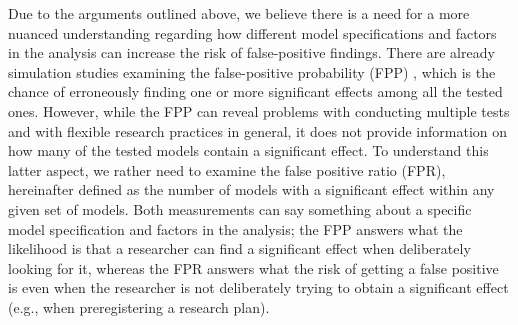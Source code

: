 Due to the arguments outlined above, we believe there is a need for a more nuanced understanding regarding how different model specifications and factors in the analysis can increase the risk of false-positive findings. There are already simulation studies examining the false-positive probability (FPP) \citep{Simmons2011}, which is the chance of erroneously finding one or more significant effects among all the tested ones. However, while the FPP can reveal problems with conducting multiple tests and with flexible research practices in general, it does not provide information on how many of the tested models contain a significant effect. To understand this latter aspect, we rather need to examine the false positive ratio (FPR), hereinafter defined as the number of models with a significant effect within any given set of models. Both measurements can say something about a specific model specification and factors in the analysis; the FPP answers what the likelihood is that a researcher can find a significant effect when deliberately looking for it, whereas the FPR answers what the risk of getting a false positive is even when the researcher is not deliberately trying to obtain a significant effect (e.g., when preregistering a research plan). \\

